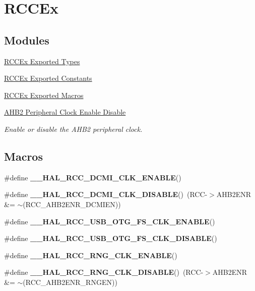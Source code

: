 \hypertarget{group___r_c_c_ex}{}\section{R\+C\+C\+Ex}
\label{group___r_c_c_ex}
\subsection*{Modules}
\begin{DoxyCompactItemize}
\item 
\hyperlink{group___r_c_c_ex___exported___types}{R\+C\+C\+Ex Exported Types}
\item 
\hyperlink{group___r_c_c_ex___exported___constants}{R\+C\+C\+Ex Exported Constants}
\item 
\hyperlink{group___r_c_c_ex___exported___macros}{R\+C\+C\+Ex Exported Macros}
\item 
\hyperlink{group___r_c_c_ex___a_h_b2___clock___enable___disable}{A\+H\+B2 Peripheral Clock Enable Disable}
\begin{DoxyCompactList}\small\item\em Enable or disable the A\+H\+B2 peripheral clock. \end{DoxyCompactList}\end{DoxyCompactItemize}
\subsection*{Macros}
\begin{DoxyCompactItemize}
\item 
\#define {\bfseries \+\_\+\+\_\+\+H\+A\+L\+\_\+\+R\+C\+C\+\_\+\+D\+C\+M\+I\+\_\+\+C\+L\+K\+\_\+\+E\+N\+A\+B\+LE}()
\item 
\#define {\bfseries \+\_\+\+\_\+\+H\+A\+L\+\_\+\+R\+C\+C\+\_\+\+D\+C\+M\+I\+\_\+\+C\+L\+K\+\_\+\+D\+I\+S\+A\+B\+LE}()~(R\+CC-\/$>$A\+H\+B2\+E\+NR \&= $\sim$(R\+C\+C\+\_\+\+A\+H\+B2\+E\+N\+R\+\_\+\+D\+C\+M\+I\+EN))\hypertarget{group___r_c_c_ex_gab32b44a18d532de3c3e56187787cfbc8}{}\label{group___r_c_c_ex_gab32b44a18d532de3c3e56187787cfbc8}

\item 
\#define {\bfseries \+\_\+\+\_\+\+H\+A\+L\+\_\+\+R\+C\+C\+\_\+\+U\+S\+B\+\_\+\+O\+T\+G\+\_\+\+F\+S\+\_\+\+C\+L\+K\+\_\+\+E\+N\+A\+B\+LE}()
\item 
\#define {\bfseries \+\_\+\+\_\+\+H\+A\+L\+\_\+\+R\+C\+C\+\_\+\+U\+S\+B\+\_\+\+O\+T\+G\+\_\+\+F\+S\+\_\+\+C\+L\+K\+\_\+\+D\+I\+S\+A\+B\+LE}()
\item 
\#define {\bfseries \+\_\+\+\_\+\+H\+A\+L\+\_\+\+R\+C\+C\+\_\+\+R\+N\+G\+\_\+\+C\+L\+K\+\_\+\+E\+N\+A\+B\+LE}()
\item 
\#define {\bfseries \+\_\+\+\_\+\+H\+A\+L\+\_\+\+R\+C\+C\+\_\+\+R\+N\+G\+\_\+\+C\+L\+K\+\_\+\+D\+I\+S\+A\+B\+LE}()~(R\+CC-\/$>$A\+H\+B2\+E\+NR \&= $\sim$(R\+C\+C\+\_\+\+A\+H\+B2\+E\+N\+R\+\_\+\+R\+N\+G\+EN))\hypertarget{group___r_c_c_ex_ga8f885339c99130e538e4d7474933d470}{}\label{group___r_c_c_ex_ga8f885339c99130e538e4d7474933d470}

\end{DoxyCompactItemize}


